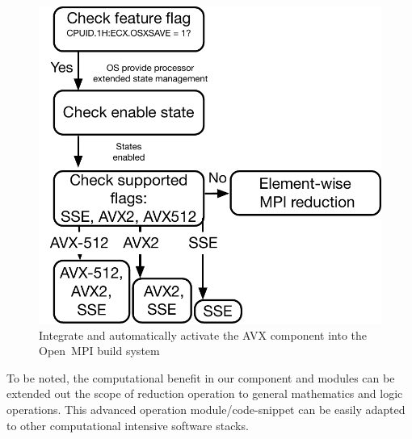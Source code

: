 \documentclass[5p,times,twocolumn]{elsarticle}
\newcommand{\ompi}[0]{Open~MPI\xspace}
\begin{document}
\begin{figure}[h]
    \centering
    \includegraphics[scale=.45]{avx-graph.pdf}
    \caption{Integrate and automatically activate the AVX component into the \ompi build system}
    \label{fig:512flow}
\end{figure}

To be noted, the computational benefit in our component and modules can be
extended out the scope of reduction operation to general mathematics and logic operations.
This advanced operation module/code-snippet can be easily adapted to other computational intensive software stacks.
\end{document}
